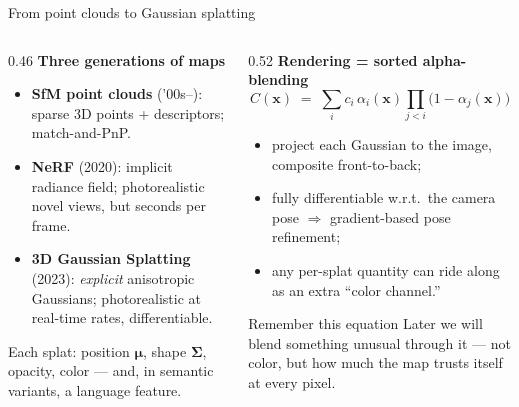 \documentclass[aspectratio=169,10pt]{beamer}
\newcommand{\good}[1]{{\color{uLow}#1}}
\newcommand{\bad}[1]{{\color{uHigh}#1}}
\begin{document}
\begin{frame}{From point clouds to Gaussian splatting}
  \begin{columns}[T]
    \begin{column}{0.46\textwidth}
      \textbf{Three generations of maps}
      \begin{itemize}
        \item \textbf{SfM point clouds} ('00s--): sparse 3D points +
              descriptors; match-and-PnP.
        \item \textbf{NeRF} (2020): implicit radiance field;
              photorealistic novel views, but \bad{seconds per frame}.
        \item \textbf{3D Gaussian Splatting} (2023): \emph{explicit}
              anisotropic Gaussians; photorealistic \good{at real-time
              rates}, differentiable.
      \end{itemize}
      \vspace{1mm}
      Each splat: position $\bm\mu$, shape $\bm\Sigma$, opacity, color ---
      and, in semantic variants, a language feature.
    \end{column}
    \begin{column}{0.52\textwidth}
      \textbf{Rendering = sorted alpha-blending}
      \begin{equation*}
        C(\mathbf{x}) \;=\; \sum_i c_i\, \alpha_i(\mathbf{x})
        \prod_{j<i} \big(1 - \alpha_j(\mathbf{x})\big)
      \end{equation*}
      \begin{itemize}
        \item project each Gaussian to the image, composite front-to-back;
        \item fully differentiable w.r.t.\ the camera pose
              $\Rightarrow$ \good{gradient-based pose refinement};
        \item any per-splat quantity can ride along as an extra
              ``color channel.''
      \end{itemize}
      \begin{block}{Remember this equation}
        Later we will blend something unusual through it --- not color,
        but \alert{how much the map trusts itself} at every pixel.
      \end{block}
    \end{column}
  \end{columns}
\end{frame}
\end{document}
